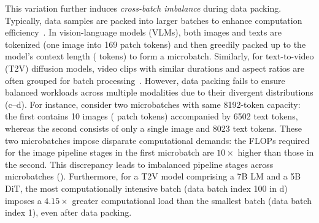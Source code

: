 This variation further induces \emph{cross-batch imbalance} during data packing.
Typically, data samples are packed into larger batches to enhance computation efficiency~\cite{dynapipe-eurosys24,wlb-llm-osdi25}.
In vision-language models (VLMs),
both images and texts are tokenized (\eg one image into 169 patch tokens)
and then greedily packed up to the model's context length ( tokens) to form a microbatch.
Similarly, for text-to-video (T2V) diffusion models,
video clips with similar durations and aspect ratios are often grouped for batch processing~\cite{moviegen-arxiv24,step-t2v-arxiv25}.
However, data packing fails to ensure balanced workloads across multiple modalities
due to their divergent distributions (c--d).
For instance, consider two microbatches with same 8192-token capacity:
the first contains 10 images ( patch tokens) accompanied by 6502 text tokens,
whereas the second consists of only a single image and 8023 text tokens.
These two microbatches impose disparate computational demands:
the FLOPs required for the image pipeline stages in the first microbatch are $10\times$ higher than those in the second.
This discrepancy leads to imbalanced pipeline stages across microbatches ().
Furthermore, for a T2V model comprising a 7B LM and a 5B DiT,
the most computationally intensive batch (data batch index 100 in d) imposes a $4.15\times$ greater computational load than the smallest batch (data batch index 1),
even after data packing.


